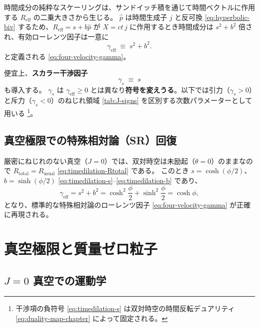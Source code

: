 \documentclass[dvipdfmx,a4paper,oneside]{jsbook}
\numberwithin{equation}{chapter}
\begin{document}
時間成分の純粋なスケーリングは、サンドイッチ積を通じて時間ベクトルに作用する \(R_{\mathrm{eff}}\) の二乗大きさから生じる。
\(\hat{p}\) は時間生成子 \(j\) と反可換 \eqref{eq:hyperbolic-biv} するため、\(R_{\mathrm{eff}} = s + b\hat{p}\) が \(X = ct\, j\) に作用するとき時間成分は \(s^2 + b^2\) 倍され、有効ローレンツ因子は一意に
\begin{equation}
  \boxed{\;
  \gamma_{\mathrm{eff}} \;\equiv\; s^2 + b^2.
  \;}
  \label{eq:timedilation-gamma-eff}
\end{equation}
と定義される \eqref{eq:four-velocity-gamma}。

便宜上、\textbf{スカラー干渉因子}
\begin{equation}
  \gamma_s \;\equiv\; s
  \label{eq:timedilation-gamma-s}
\end{equation}
も導入する。
\(\gamma_s\) は \(\gamma_{\mathrm{eff}} \geq 0\) とは異なり\textbf{符号を変えうる}。以下では引力（\(\gamma_s > 0\)）と斥力（\(\gamma_s < 0\)）のねじれ領域 \eqref{tab:J-signs} を区別する次数パラメーターとして用いる \footnote{干渉項の負符号 \eqref{eq:timedilation-s} は双対時空の時間反転デュアリティ \eqref{eq:duality-map-chapter} によって固定される。}。

\subsection{真空極限での特殊相対論（SR）回復}

厳密にねじれのない真空（\(J = 0\)）では、双対時空は未励起（\(\theta = 0\)）のままなので \(R_{\mathrm{total}} = R_{\mathrm{usual}}\) \eqref{eq:timedilation-Rtotal} である。
このとき \(s = \cosh(\phi/2)\)、\(b = \sinh(\phi/2)\) \eqref{eq:timedilation-s}–\eqref{eq:timedilation-b} であり、
\begin{equation}
  \gamma_{\mathrm{eff}}
  = s^2 + b^2
  = \cosh^2\frac{\phi}{2} + \sinh^2\frac{\phi}{2}
  = \cosh\phi,
  \label{eq:timedilation-vacuum-sr}
\end{equation}
となり、標準的な特殊相対論のローレンツ因子 \eqref{eq:four-velocity-gamma} が正確に再現される。

\section{真空極限と質量ゼロ粒子}

\subsection{\(J = 0\) 真空での運動学}
\end{document}
